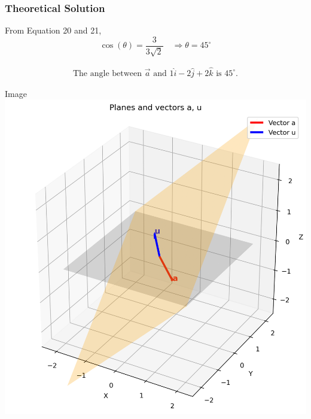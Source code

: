\documentclass{beamer}
\begin{document}
\begin{frame}[fragile]
\frametitle{Theoretical Solution}
From Equation 20 and 21,
\begin{equation}
    \cos(\theta) = \dfrac{3}{3\sqrt{2}} \quad \Rightarrow \theta = 45^\circ
\end{equation}

\begin{align}
  \boxed{\text{The angle between } \vec{a} \text{ and } 1\hat{i} -2\hat{j}+2\hat{k} \text{ is } 45^{\circ}.}  
\end{align}
\end{frame}



\begin{frame}{Image}
   \centering
    \includegraphics[width=\columnwidth, height=0.8\textheight, keepaspectratio]{figs/fig1.png}
    \label{fig:Beamer/figs/fig1.png}
\end{frame}
\end{document}
